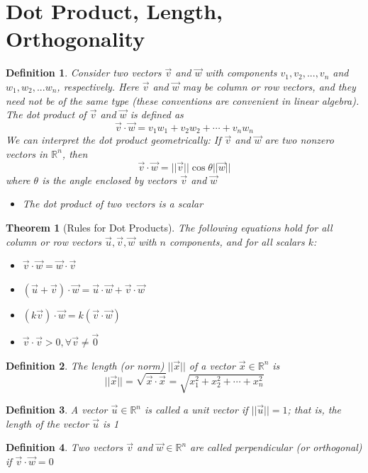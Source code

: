 \documentclass[10pt]{report}
\newtheorem{thm2}{Theorem}[section]
\newtheorem{def2}{Definition}[section]
\begin{document}
\section{Dot Product, Length, Orthogonality}
\begin{def2}
Consider two vectors $\vec{v}$ and $\vec{w}$ with components $v_1, v_2, ..., v_n$ and $w_1, w_2, ... w_n$, respectively. Here $\vec{v}$ and $\vec{w}$ may be column or row vectors, and they need not be of the same type (these conventions are convenient in linear algebra). The dot product of $\vec{v}$ and $\vec{w}$ is defined as
$$\vec{v}\cdot\vec{w}=v_1w_1+v_2w_2+ \cdots + v_nw_n$$
We can interpret the dot product geometrically: If $\vec{v}$ and $\vec{w}$ are two nonzero vectors in $\mathbb{R}^n$, then
$$\vec{v}\cdot\vec{w}=||\vec{v}|| \cos\theta ||\vec{w}||$$
where $\theta$ is the angle enclosed by vectors $\vec{v}$ and $\vec{w}$
\begin{itemize}
\item[Note:] The dot product of two vectors is a scalar
\end{itemize}
\end{def2}
\begin{thm2}[Rules for Dot Products]
The following equations hold for all column or row vectors $\vec{u}, \vec{v}, \vec{w}$ with $n$ components, and for all scalars $k$:
\begin{itemize}
\item[1.] $\vec{v}\cdot\vec{w} = \vec{w}\cdot\vec{v}$
\item[2.] $(\vec{u}+\vec{v})\cdot \vec{w} = \vec{u} \cdot \vec{w} + \vec{v} \cdot \vec{w}$
\item[3.] $(k\vec{v})\cdot \vec{w} = k( \vec{v}\cdot \vec{w})$
\item[4.] $\vec{v}\cdot \vec{v} > 0, \forall \vec{v}\neq \vec{0}$
\end{itemize}
\end{thm2}
\begin{def2}
The length (or norm) $||\vec{x}||$ of a vector $\vec{x}\in \mathbb{R}^n$ is
$$||\vec{x}||=\sqrt{\vec{x} \cdot \vec{x}} = \sqrt{x_1^2 + x_2^2 + \cdots + x_n^2}$$
\end{def2}
\begin{def2}
A vector $\vec{u}\in\mathbb{R}^n$ is called a unit vector if $||\vec{u}||=1$; that is, the length of the vector $\vec{u}$ is 1
\end{def2}
\begin{def2}
Two vectors $\vec{v}$ and $\vec{w}\in \mathbb{R}^n$ are called perpendicular (or orthogonal) if $\vec{v} \cdot \vec{w} = 0$
\end{def2}
\end{document}
